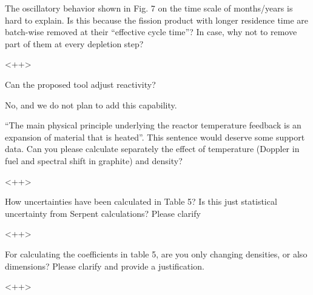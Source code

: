 \documentclass[answers,11pt]{exam}
\begin{document}
\begin{questions}

        \question The oscillatory behavior shown in Fig. 7 on the time scale of 
        months/years is hard to explain. Is this because the fission product 
        with longer residence time are batch-wise removed at their ``effective 
        cycle time''? In case, why not to remove part of them at every depletion 
        step?  
        \begin{solution}
                <++>
        \end{solution}


        \question Can the proposed tool adjust reactivity?
        \begin{solution}
                No, and we do not plan to add this capability.
        \end{solution}


        \question ``The main physical principle underlying the reactor 
        temperature feedback is an expansion of material that is heated''. This 
        sentence would deserve some support data. Can you please calculate 
        separately the effect of temperature (Doppler in fuel and spectral 
        shift in graphite) and density?
        \begin{solution}
                <++>
        \end{solution}


        \question How uncertainties have been calculated in Table 5? Is this 
        just statistical uncertainty from Serpent calculations? Please clarify
        \begin{solution}
                <++>
        \end{solution}


        \question For calculating the coefficients in table 5, are you only 
        changing densities, or also dimensions? Please clarify and provide a 
        justification.  
        \begin{solution}
                <++>
        \end{solution}


\end{questions}
\end{document}

